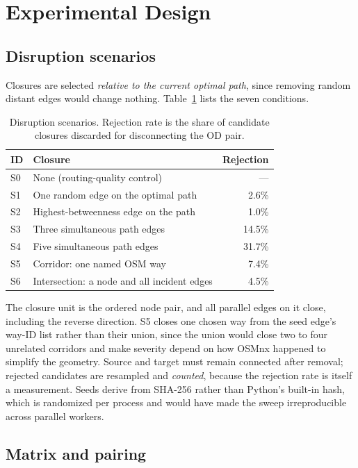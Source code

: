 \section{Experimental Design}
\label{sec:design}

\subsection{Disruption scenarios}

Closures are selected \emph{relative to the current optimal path}, since
removing random distant edges would change nothing. Table~\ref{tab:scenarios}
lists the seven conditions.

\begin{table}[t]
\caption{Disruption scenarios. Rejection rate is the share of candidate
closures discarded for disconnecting the OD pair.}
\label{tab:scenarios}
\centering
\begin{tabular}{llr}
\toprule
ID & Closure & Rejection \\
\midrule
S0 & None (routing-quality control) & --- \\
S1 & One random edge on the optimal path & 2.6\% \\
S2 & Highest-betweenness edge on the path & 1.0\% \\
S3 & Three simultaneous path edges & 14.5\% \\
S4 & Five simultaneous path edges & 31.7\% \\
S5 & Corridor: one named OSM way & 7.4\% \\
S6 & Intersection: a node and all incident edges & 4.5\% \\
\bottomrule
\end{tabular}
\end{table}

The closure unit is the ordered node pair, and all parallel edges on it close,
including the reverse direction. S5 closes one chosen way from the seed
edge's way-ID list rather than their union, since the union would close two
to four unrelated corridors and make severity depend on how OSMnx happened to
simplify the geometry. Source and target must remain connected after
removal; rejected candidates are resampled and \emph{counted}, because the
rejection rate is itself a measurement. Seeds derive from SHA-256 rather than
Python's built-in hash, which is randomized per process and would have made
the sweep irreproducible across parallel workers.

\subsection{Matrix and pairing}

